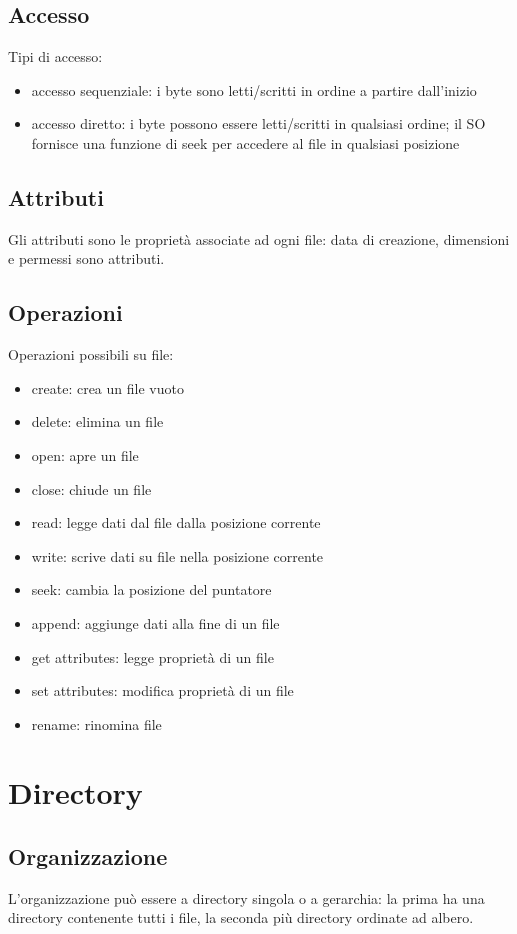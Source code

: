 \documentclass[12pt]{article}
\begin{document}
\subsection{Accesso}
Tipi di accesso:
\begin{itemize}
    \item accesso sequenziale: i byte sono letti/scritti in ordine a partire dall'inizio
    \item accesso diretto: i byte possono essere letti/scritti in qualsiasi ordine; il SO fornisce una funzione di
    seek per accedere al file in qualsiasi posizione
\end{itemize}
\subsection{Attributi}
Gli attributi sono le proprietà associate ad ogni file: data di creazione, dimensioni e permessi sono attributi.
\subsection{Operazioni}
Operazioni possibili su file:
\begin{itemize}
    \item create: crea un file vuoto
    \item delete: elimina un file
    \item open: apre un file
    \item close: chiude un file 
    \item read: legge dati dal file dalla posizione corrente
    \item write: scrive dati su file nella posizione corrente
    \item seek: cambia la posizione del puntatore 
    \item append: aggiunge dati alla fine di un file
    \item get attributes: legge proprietà di un file
    \item set attributes: modifica proprietà di un file
    \item rename: rinomina file
\end{itemize}
\section{Directory}
\subsection{Organizzazione}
L'organizzazione può essere a directory singola o a gerarchia: la prima ha una directory contenente tutti i file, la
seconda più directory ordinate ad albero.\\
\end{document}
